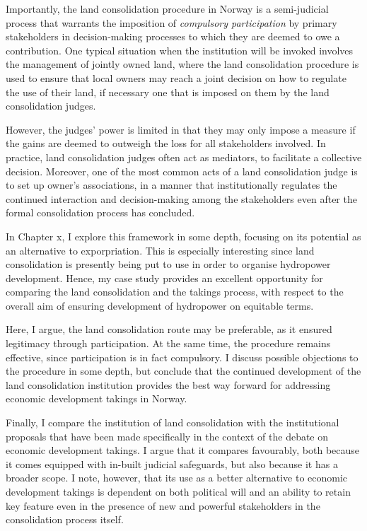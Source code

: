Importantly, the land consolidation procedure in Norway is a semi-judicial process that warrants the imposition of {\it compulsory participation} by primary stakeholders in decision-making processes to which they are deemed to owe a contribution. One typical situation when the institution will be invoked involves the management of jointly owned land, where the land consolidation procedure is used to ensure that local owners may reach a joint decision on how to regulate the use of their land, if necessary one that is imposed on them by the land consolidation judges.

However, the judges' power is limited in that they may only impose a measure if the gains are deemed to outweigh the loss for all stakeholders involved. In practice, land consolidation judges often act as mediators, to facilitate a collective decision. Moreover, one of the most common acts of a land consolidation judge is to set up owner's associations, in a manner that institutionally regulates the continued interaction and decision-making among the stakeholders even after the formal consolidation process has concluded.

In Chapter x, I explore this framework in some depth, focusing on its potential as an alternative to exporpriation. This is especially interesting since land consolidation is presently being put to use in order to organise hydropower development. Hence, my case study provides an excellent opportunity for comparing the land consolidation and the takings process, with respect to the overall aim of ensuring development of hydropower on equitable terms. 

Here, I argue, the land consolidation route may be preferable, as it ensured legitimacy through participation. At the same time, the procedure remains effective, since participation is in fact compulsory. I discuss possible objections to the procedure in some depth, but conclude that the continued development of the land consolidation institution provides the best way forward for addressing economic development takings in Norway.

Finally, I compare the institution of land consolidation with the institutional proposals that have been made specifically in the context of the debate on economic development takings. I argue that it compares favourably, both because it comes equipped with in-built judicial safeguards, but also because it has a broader scope. I note, however, that its use as a better alternative to economic development takings is dependent on both political will and an ability to retain key feature even in the presence of new and powerful stakeholders in the consolidation process itself.


